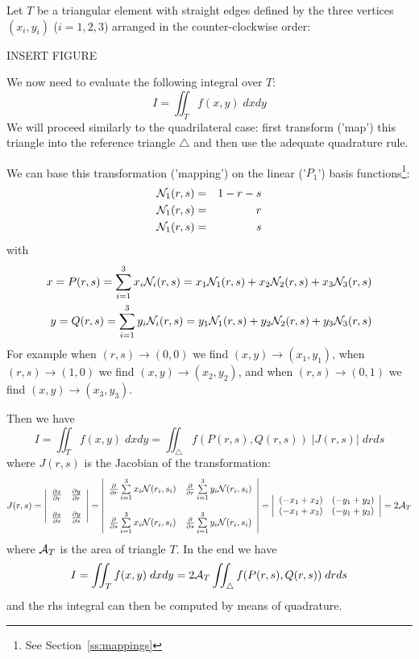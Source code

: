 Let $T$ be a triangular element with straight edges defined by the three vertices $(x_i,y_i)$ ($i=1,2,3$)
arranged in the counter-clockwise order:

INSERT FIGURE

We now need to evaluate the following integral over $T$:
\[
I = \iint_T f(x,y) \; dxdy
\]
We will proceed similarly to the quadrilateral case: first transform ('map') this triangle into 
the reference triangle $\triangle$ and then use the adequate quadrature rule. 

We can base this transformation ('mapping') on the linear ('$P_1$') basis functions\footnote{See
Section~\ref{ss:mappings}}: 
\begin{eqnarray} 
{\mathcal{N}}_1(r,s) &=&1-r-s \nonumber\\
{\mathcal{N}}_1(r,s) &=& r\nonumber\\
{\mathcal{N}}_1(r,s) &=& s\nonumber
\end{eqnarray} 
with 
\begin{eqnarray} 
x=P(r,s)=\sum_{i=1}^3 x_i {\mathcal{N}}_i(r,s)= x_1 {\mathcal{N}}_1(r,s) + x_2 {\mathcal{N}}_2(r,s) + x_3 {\mathcal{N}}_3(r,s)  \nonumber\\
y=Q(r,s)=\sum_{i=1}^3 y_i {\mathcal{N}}_i(r,s)= y_1 {\mathcal{N}}_1(r,s) + y_2 {\mathcal{N}}_2(r,s) + y_3 {\mathcal{N}}_3(r,s)  \nonumber
\end{eqnarray} 
For example when $(r,s)\rightarrow(0,0)$ we find $(x,y)\rightarrow (x_1,y_1)$,
when $(r,s)\rightarrow(1,0)$ we find $(x,y)\rightarrow (x_2,y_2)$,
and when $(r,s)\rightarrow(0,1)$ we find $(x,y)\rightarrow (x_3,y_3)$.

Then we have 
\[
I = \iint_T f(x,y) \; dxdy = \iint_\triangle f(P(r,s),Q(r,s))\; |J(r,s)| \; drds
\]
where $J(r,s)$ is the Jacobian of the transformation:
\[
J(r,s) = 
\left|
\begin{array}{cc}
\frac{\partial x}{\partial r} & \frac{\partial y}{\partial r} \\ \\
\frac{\partial x}{\partial s} & \frac{\partial y}{\partial s} 
\end{array}
\right|
=
\left|
\begin{array}{cc}
\frac{\partial }{\partial r} \sum\limits_{i=1}^3 x_i {\mathcal{N}}(r_i,s_i) & 
\frac{\partial }{\partial r} \sum\limits_{i=1}^3 y_i {\mathcal{N}}(r_i,s_i) \\ \\
\frac{\partial }{\partial s} \sum\limits_{i=1}^3 x_i {\mathcal{N}}(r_i,s_i) & 
\frac{\partial }{\partial s} \sum\limits_{i=1}^3 y_i {\mathcal{N}}(r_i,s_i)
\end{array}
\right|
=
\left|
\begin{array}{cc}
(-x_1+x_2) & (-y_1+y_2) \\
(-x_1+x_3) & (-y_1+y_3)
\end{array}
\right|
=2 {\cal A}_T
\]
where ${\cal A}_T$ is the area of triangle $T$. In the end we have 
\[
I = \iint_T f(x,y) \; dxdy = 2 {\cal A}_T \iint_\triangle f(P(r,s),Q(r,s))\;  drds
\]
and the rhs integral can then be computed by means of quadrature.









